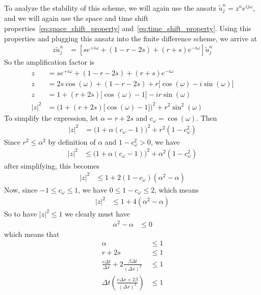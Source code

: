 \documentclass[twocolumn]{myarticle}
\begin{document}
To analyze the stability of this scheme, we will again use the ansatz $ \tilde{u}^n_j = z^n e^{i j \omega} $, and we will again use the space and time shift properties~\eqref{eq:space_shift_property} and~\eqref{eq:time_shift_property}.
Using this properties and plugging this ansatz into the finite difference scheme, we arrive at
\begin{align}
    z \tilde{u}^n_j &= \left[ s e^{+i\omega} + (1 - r - 2s) + (r+s) e^{-i\omega} \right] \tilde{u}^n_j
\end{align}
So the amplification factor is
\begin{align}
    z &= s e^{+i\omega} + (1 - r - 2s) + (r+s) e^{-i\omega}
    \\
    z &= 2 s \cos(\omega) + (1 - r - 2s) + r \big[ \cos(\omega) - i \sin(\omega) \big]
    \\
    z &= 1 + (r + 2 s) \big[\cos(\omega) - 1 \big] - i r \sin(\omega)
    \\
    |z|^2 &= \Big( 1 + (r + 2 s) \big[\cos(\omega) - 1 \big] \Big)^2 + r^2 \sin^2(\omega)
\end{align}
To simplify the expression, let $ \alpha = r + 2s $ and $ c_\omega = \cos(\omega) $.
Then
\begin{align}
    |z|^2 &= \Big( 1 + \alpha (c_\omega-1) \Big)^2 + r^2 \left( 1 - c_\omega^2 \right)
\end{align}
Since $ r^2 \leq \alpha^2 $ by definition of $ \alpha $ and $ 1 - c_\omega^2 > 0 $, we have
\begin{align}
    |z|^2 &\leq \Big( 1 + \alpha (c_\omega-1) \Big)^2 + \alpha^2 \left( 1 - c_\omega^2 \right)
\end{align}
after simplifying, this becomes
\begin{align}
    |z|^2 &\leq 1 + 2 (1 - c_\omega) \left( \alpha^2 - \alpha \right)
\end{align}
Now, since $ -1 \leq c_\omega \leq 1 $, we have $ 0 \leq 1 - c_\omega \leq 2 $, which means
\begin{align}
    |z|^2 &\leq 1 + 4 \left( \alpha^2 - \alpha \right)
\end{align}
So to have $ |z|^2 \leq 1 $ we clearly must have
\begin{align}
    \alpha^2 - \alpha &\leq 0
\end{align}
which means that
\begin{align}
    \alpha &\leq 1
    \\
    r + 2 s &\leq 1
    \\
    \frac{c \Delta t}{\Delta x} + 2 \frac{\beta \Delta t}{(\Delta x)^2} &\leq 1
    \\
    \Delta t \left( \frac{c \Delta x + 2 \beta}{(\Delta x)^2} \right) &\leq 1
\end{align}
\end{document}
